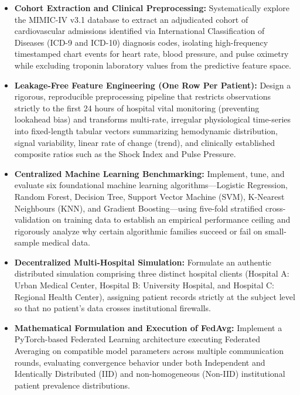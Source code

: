 \begin{itemize}
    \item \textbf{Cohort Extraction and Clinical Preprocessing:} Systematically explore the MIMIC-IV v3.1 database to extract an adjudicated cohort of cardiovascular admissions identified via International Classification of Diseases (ICD-9 and ICD-10) diagnosis codes, isolating high-frequency timestamped chart events for heart rate, blood pressure, and pulse oximetry while excluding troponin laboratory values from the predictive feature space.
    
    \item \textbf{Leakage-Free Feature Engineering (One Row Per Patient):} Design a rigorous, reproducible preprocessing pipeline that restricts observations strictly to the first 24 hours of hospital vital monitoring (preventing lookahead bias) and transforms multi-rate, irregular physiological time-series into fixed-length tabular vectors summarizing hemodynamic distribution, signal variability, linear rate of change (trend), and clinically established composite ratios such as the Shock Index and Pulse Pressure.
    
    \item \textbf{Centralized Machine Learning Benchmarking:} Implement, tune, and evaluate six foundational machine learning algorithms—Logistic Regression, Random Forest, Decision Tree, Support Vector Machine (SVM), K-Nearest Neighbours (KNN), and Gradient Boosting—using five-fold stratified cross-validation on training data to establish an empirical performance ceiling and rigorously analyze why certain algorithmic families succeed or fail on small-sample medical data.
    
    \item \textbf{Decentralized Multi-Hospital Simulation:} Formulate an authentic distributed simulation comprising three distinct hospital clients (Hospital A: Urban Medical Center, Hospital B: University Hospital, and Hospital C: Regional Health Center), assigning patient records strictly at the subject level so that no patient's data crosses institutional firewalls.
    
    \item \textbf{Mathematical Formulation and Execution of FedAvg:} Implement a PyTorch-based Federated Learning architecture executing Federated Averaging on compatible model parameters across multiple communication rounds, evaluating convergence behavior under both Independent and Identically Distributed (IID) and non-homogeneous (Non-IID) institutional patient prevalence distributions.
    

\end{itemize}
